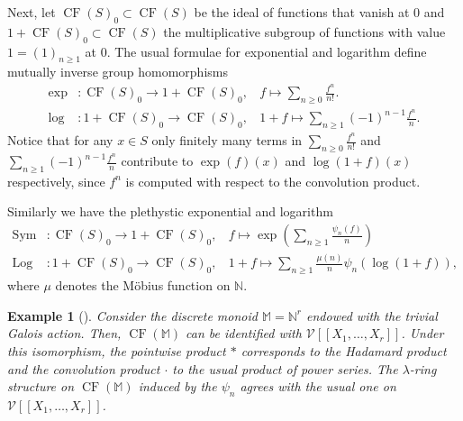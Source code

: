 \documentclass{article}
\DeclareMathOperator{\Sym}{Sym}
\newcommand{\BM}{{\mathbb{M}}}
\newcommand{\BN}{{\mathbb{N}}}
\newcommand{\CV}{{\mathcal V}}
\DeclareMathOperator{\mcf}{CF}
\DeclareMathOperator{\Log}{Log}
\theoremstyle{definition}
\theoremstyle{plain}
\newtheorem{example}[definition]{Example}
\begin{document}
Next, let $\mcf(S)_0 \subset \mcf(S)$ be the ideal of functions that vanish at $0$ and $1+ \mcf(S)_0 \subset  \mcf(S)$ the multiplicative subgroup of functions with value $1=(1)_{n\geq 1 }$ at $0$. The usual formulae for exponential and logarithm define mutually inverse group homomorphisms
 \begin{align*}\exp&: \mcf(S)_0 \rightarrow 1 + \mcf(S)_0, \ \ \ \  f \mapsto \sum_{n \geq 0} \frac{f^n}{n!}.\\
\log&: 1+ \mcf(S)_0 \rightarrow \mcf(S)_0, \ \ \ \ 1+ f \mapsto \sum_{n\geq 1} (-1)^{n-1} \frac{f^n}{n}. \end{align*}
Notice that for any $x \in S$  only finitely many terms in $ \sum_{n \geq 0} \frac{f^n}{n!}$ and $\sum_{n\geq 1} (-1)^{n-1} \frac{f^n}{n}$ contribute to $\exp(f)(x)$ and $\log(1+f)(x)$ respectively, since $f^n$ is computed with respect to the convolution product. 

Similarly we have the plethystic exponential and logarithm
\begin{align*} \Sym&: \mcf(S)_0 \rightarrow 1 + \mcf(S)_0,  \ \ \ \ f \mapsto \exp \left(\sum_{n \geq 1} \frac{\psi_n(f)}{n}  \right)\\
\Log&: 1 + \mcf(S)_0 \rightarrow \mcf(S)_0, \ \ \ \  1+ f \mapsto \sum_{n \geq 1} \frac{\mu(n)}{n} \psi_n(\log(1+f)),
  \end{align*}
where $\mu$ denotes the Möbius function on $\BN$.


\begin{example}[{\cite[Example 4.2]{Me17b}}]\label{dimon} Consider the discrete monoid $\BM = \BN^r$ endowed with the trivial Galois action. Then, $ \mcf(\BM)$ can be identified with $\CV[[X_1,\dots,X_r]]$. Under this isomorphism, the pointwise product $*$ corresponds to the Hadamard product and the convolution product $\cdot$ to the usual product of power series. The $\lambda$-ring structure on  $ \mcf(\BM)$  induced by the $\psi_n$ agrees with the usual one on $\CV[[X_1,\dots,X_r]]$.
\end{example}
\end{document}

